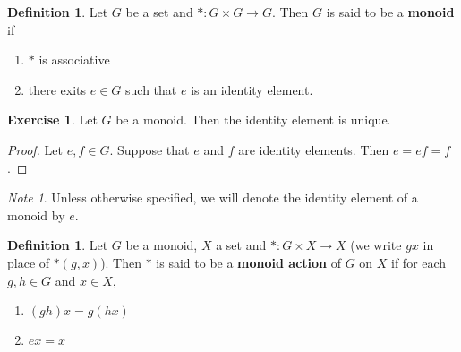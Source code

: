 \documentclass[12pt]{amsart}
\theoremstyle{definition}
\newtheorem{defn}[definition]{Definition}
\theoremstyle{remark}
\newtheorem{note}[remark]{Note}
\theoremstyle{definition}
\newtheorem{ex}[definition]{Exercise}
\begin{document}
	\begin{defn}
	Let $G$ be a set and $*: G \times G \rightarrow G$. Then $G$ is said to be a \textbf{monoid} if 
	\begin{enumerate}
	\item $*$ is associative
	\item there exits $e \in G$ such that $e$ is an identity element.
	\end{enumerate}
	\end{defn}	
	
	\begin{ex}
	Let $G$ be a monoid. Then the identity element is unique.
	\end{ex}
	
	\begin{proof}
	Let $e, f \in G$. Suppose that $e$ and $f$ are identity elements. Then $e = ef = f$.
	\end{proof}
	
	\begin{note}
	Unless otherwise specified, we will denote the identity element of a monoid by $e$.
	\end{note}
	
	\begin{defn}
	Let $G$ be a monoid, $X$ a set and $*: G \times X \rightarrow X$ (we write $gx$ in place of $*(g,x)$). Then $*$ is said to be a \textbf{monoid action} of $G$ on $X$ if for each $g,h \in G$ and $x \in X$,
	\begin{enumerate}
	\item $(gh)x = g(hx)$
	\item $ex = x$
	\end{enumerate}
	\end{defn}
	

	
	
	
	
	
	
	
	
	
	
	
	
	
\end{document}
